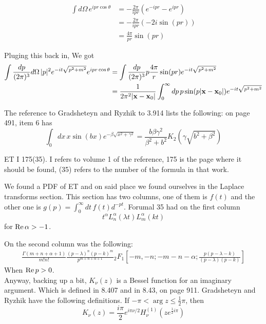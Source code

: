 \begin{align*}
\int d\Omega \, e^{ipr\cos\theta} &= 
    -\frac{2\pi}{ipr} \left( e^{-ipr} - e^{ipr} \right) \\
&= -\frac{2\pi}{ipr} \left(-2i \sin(pr) \right) \\
&= \frac{4\pi}{pr} \sin(pr)
\end{align*}

Pluging this back in,
We got
\begin{align}
\int \frac{dp}{(2\pi)^3} d\Omega \, |p|^2 e^{-it\sqrt{p^2 + m^2}} e^{ipr\cos\theta} &=
\int \frac{dp}{(2\pi)^3} p \frac{4\pi}{r} \sin(pr) e^{-it\sqrt{p^2 + m^2}} \\
&= \frac{1}{2\pi^2 |\boldsymbol{\mathbf{x}}-\boldsymbol{\mathbf{x}}_0|}
    \int_{0}^{\infty} dp \, p \sin(p|\boldsymbol{\mathbf{x}}-\boldsymbol{\mathbf{x}}_0|) e^{-it\sqrt{p^2 + m^2}} \label{kg-relativistic-simplified}
\end{align}

The reference to Gradsheteyn and Ryzhik to 3.914 lists the following: on page 491, item 6 has
\begin{equation}
\int_{0} dx\, x \sin(bx) e^{-\beta \sqrt{x^2 + \gamma^2}} =
    \frac{b \beta \gamma^2}{\beta^2 + b^2} K_2\left(\gamma \sqrt{b^2 + \beta^2}\right) \label{Gradsheteyn-kg-relativistic}
\end{equation}

ET I 175(35).
I refers to volume 1 of the reference, 175 is the page where it should be found, (35) refers to the number of the formula
in that work.

We found a PDF of ET and on said place we found ourselves in the Laplace transforms section.
This section has two columns, one of them is $f(t)$ and the other one is $g(p) = \int_{0}^{\infty} dt\, f(t) d^{-pt}$.
Forumal 35 had on the first column
$$
t^\alpha L_{n}^{\alpha} (\lambda t) L_{m}^{\alpha} (k t)
$$
for $\operatorname{Re}{\alpha} > -1$.

On the second column was the following:
\begin{align*}
\frac{\Gamma(m+n+\alpha + 1)}{m! n!}
\frac{(p-\lambda)^n (p-k)^m}{p^{m+n+\alpha +1}}
{}_{2}F_{1} \left[ -m, -n; -m-n-\alpha; \frac{p(p-\lambda -k)}{(p-\lambda)(p-k)} \right]
\end{align*}
When $\operatorname{Re}{p} > 0$.
\\

Anyway, backing up a bit, $K_\nu (z)$ is a Bessel function for an imaginary argument.
Which is defined in 8.407 and in 8.43, on page 911.
Gradsheteyn and Ryzhik have the following definitions.
If $-\pi < \arg{z} \leq \frac{1}{2}\pi$, then
$$
K_\nu (z) = \frac{i\pi}{2} e^{i\pi\nu /2} H_{\nu}^{(1)} \left(z e^{\frac{1}{2} i\pi} \right)
$$

